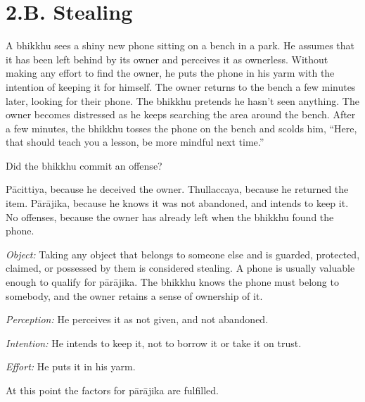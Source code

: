 \chapter{2.B. Stealing}
\renewcommand*{\theChapterTitle}{2.B. Stealing}

\begin{exam}{\autoExamName}

\begin{problem}

  A bhikkhu sees a shiny new phone sitting on a bench in a park. He assumes that it has been left behind by its owner and perceives it as ownerless.
  Without making any effort to find the owner, he puts the phone in his yarm with the intention of keeping it for himself.
  The owner returns to the bench a few minutes later, looking for their phone.
  The bhikkhu pretends he hasn't seen anything.
  The owner becomes distressed as he keeps searching the area around the bench.
  After a few minutes, the bhikkhu tosses the phone on the bench and scolds him,
  ``Here, that should teach you a lesson, be more mindful next time.''

  Did the bhikkhu commit an offense?

\bigskip

\begin{manswers}{1}
    \bChoices
     Pācittiya, because he deceived the owner. \eAns
     Thullaccaya, because he returned the item. \eAns
     Pārājika, because he knows it was not abandoned, and intends to keep it. \eAns
     No offenses, because the owner has already left when the bhikkhu found the phone. \eAns
    \eChoices
\end{manswers}

\begin{solution}
  \emph{Object:}
  Taking any object that belongs to someone else and is guarded, protected, claimed, or possessed by them is considered stealing.
  A phone is usually valuable enough to qualify for pārājika.
  The bhikkhu knows the phone must belong to somebody, and the owner retains a sense of ownership of it.

  \emph{Perception:} He perceives it as not given, and not abandoned.

  \emph{Intention:} He intends to keep it, not to borrow it or take it on trust.

  \emph{Effort:} He puts it in his yarm.

  At this point the factors for pārājika are fulfilled.
\end{solution}


\end{problem}
\end{exam}
